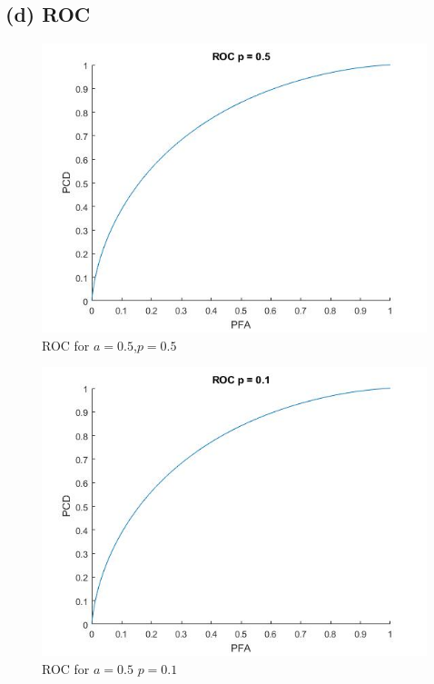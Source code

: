 \documentclass[a4paper,11pt]{article}
\begin{document}
 \subsection*{(d) ROC}
 \begin{figure}[h]
   \hspace*{-1cm}
    \includegraphics[scale=0.5]{q2_d_2}
    \caption{ROC for $a=0.5$,$p=0.5$}\label{fig:q2_d_1}
\end{figure}
 \begin{figure}[h]
   \hspace*{-1cm}
    \includegraphics[scale=0.5]{q2_d_1}
    \caption{ROC for $a=0.5$ $p = 0.1$}\label{fig:q2_d_1}
\end{figure}
\clearpage
\newpage
\end{document}
